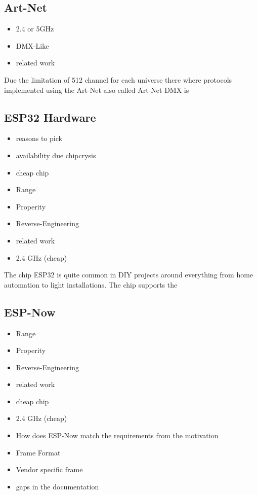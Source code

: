 \documentclass[]{ccs-thesis}
\begin{document}
\subsection{Art-Net}
\label{sec:artnet}
\begin{itemize}
\item 2.4 or 5GHz
\item DMX-Like
\item related work
\end{itemize}

Due the limitation of 512 channel for each universe there where protocols implemented using the 
Art-Net also called Art-Net DMX is 

\subsection{ESP32 Hardware}
\begin{itemize}
\item reasons to pick
\item availability due chipcrysis
\item cheap chip
\item Range
\item Properity
\item Reverse-Engineering 
\item related work
\item 2.4 GHz (cheap)
\end{itemize}
The chip ESP32 is quite common in DIY projects around everything from home automation to light installations. The chip supports the 

\subsection{ESP-Now}
\label{sub:ESP-Now}
\begin{itemize}
\item Range
\item Properity
\item Reverse-Engineering 
\item related work
\item cheap chip
\item 2.4 GHz (cheap)
\item How does ESP-Now match the requirements from the motivation
\item Frame Format
\item Vendor specific frame
\item gaps in the documentation
\end{itemize}
\end{document}
